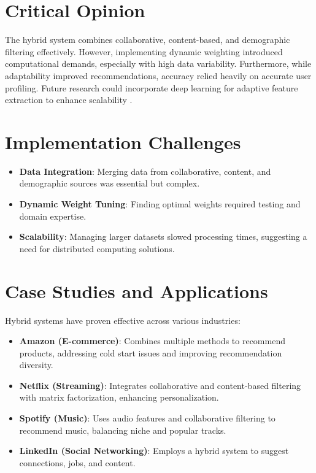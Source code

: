 \documentclass{article}
\begin{document}
\section{Critical Opinion}

The hybrid system combines collaborative, content-based, and demographic filtering effectively. However, implementing dynamic weighting introduced computational demands, especially with high data variability. Furthermore, while adaptability improved recommendations, accuracy relied heavily on accurate user profiling. Future research could incorporate deep learning for adaptive feature extraction to enhance scalability \cite{Aggarwal2016}.

\section{Implementation Challenges}

\begin{itemize}
    \item \textbf{Data Integration}: Merging data from collaborative, content, and demographic sources was essential but complex.
    \item \textbf{Dynamic Weight Tuning}: Finding optimal weights required testing and domain expertise.
    \item \textbf{Scalability}: Managing larger datasets slowed processing times, suggesting a need for distributed computing solutions.
\end{itemize}

\section{Case Studies and Applications}

Hybrid systems have proven effective across various industries:

\begin{itemize}
    \item \textbf{Amazon (E-commerce)}: Combines multiple methods to recommend products, addressing cold start issues and improving recommendation diversity.
    \item \textbf{Netflix (Streaming)}: Integrates collaborative and content-based filtering with matrix factorization, enhancing personalization.
    \item \textbf{Spotify (Music)}: Uses audio features and collaborative filtering to recommend music, balancing niche and popular tracks.
    \item \textbf{LinkedIn (Social Networking)}: Employs a hybrid system to suggest connections, jobs, and content.
\end{itemize}
\end{document}
